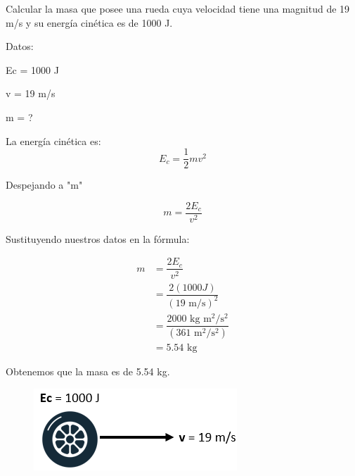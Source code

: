 \question[10] Calcular la masa que posee una rueda cuya velocidad tiene una magnitud de 19 m/s y su energía cinética es de 1000 J.

\begin{minipage}{0.65\textwidth}
    \begin{solutionbox}{8cm}
        \begin{multicols}{2}
            Datos:

            Ec = 1000 J

            v = 19 m/s

            m = ?

            La energía cinética es:
            \[E_c=\frac{1}{2}mv^2\]

            Despejando a "m"

            \[m=\dfrac{2E_c}{v^2}\]

            \vspace{2cm}

            Sustituyendo nuestros datos en la fórmula:

            \[
                \begin{array}{rl}
                    m & =\dfrac{2E_c}{v^2}                                              \\[1em]
                      & =\dfrac{2(1000J)}{(19 \text{ m/s})^2}                           \\[1em]
                      & =\dfrac{2000 \text{ kg m$^2$/s$^2$}}{(361 \text{ m$^2$/s$^2$})} \\[1em]
                      & =5.54 \text{ kg}
                \end{array}
            \]






        \end{multicols}
        \begin{center} Obtenemos que la masa es de 5.54 kg.\end{center}
    \end{solutionbox}
\end{minipage}\hfill
\begin{minipage}{0.3\textwidth}
    \begin{figure}[H]
        \includegraphics[width=\linewidth]{../images/energia_cinetica_problema_3.png}
    \end{figure}
\end{minipage}